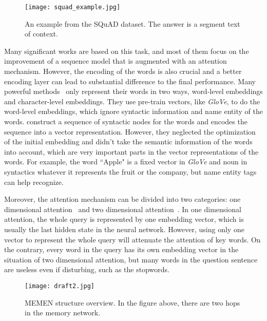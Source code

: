 \documentclass[letterpaper]{article}
\begin{document}
\begin{figure}[htbp]

  \texttt{[image: squad\_example.jpg]}
\caption{An example from the SQuAD dataset. The answer is a segment text of context.}
\end{figure}

Many significant works are based on this task, and most of them focus on the improvement of a sequence model that is augmented with an attention mechanism. However, the encoding of the words is also crucial and a better encoding layer can lead to substantial difference to the final performance. Many powerful methods~\citep{hu2017mnemonic,rnet,seo2016bidirectional} only represent their words in two ways, word-level embeddings and character-level embeddings. They use pre-train vectors, like \emph{GloVe}\citep{pennington2014glove}, to do the word-level embeddings, which ignore syntactic information and name entity of the words. \citet{liu2017structural} construct a sequence of syntactic nodes for the words and encodes the sequence into a vector representation. However, they neglected the optimization of the initial embedding and didn't take the semantic information of the words into account, which are very important parts in the vector representations of the words. For example, the word ``Apple" is a fixed vector in \emph{GloVe} and noun in syntactics whatever it represents the fruit or the company, but name entity tags can help recognize.

Moreover, the attention mechanism can be divided into two categories: one dimensional attention~\citep{chen2016thorough,dhingra2016gated,kadlec2016text} and two dimensional attention~\citep{cui2016attention,wang2016multi,seo2016bidirectional}. In one dimensional attention, the whole query is represented by one embedding vector, which is usually the last hidden state in the neural network. However, using only one vector to represent the whole query will attenuate the attention of key words. On the contrary, every word in the query has its own embedding vector in the situation of two dimensional attention, but many words in the question sentence are useless even if disturbing, such as the stopwords. 



\begin{figure*}[htbp]
  \begin{center}
  \texttt{[image: draft2.jpg]}
  \caption{MEMEN structure overview. In the figure above, there are two hops in the memory network.}
  \end{center}
\end{figure*}
\end{document}
